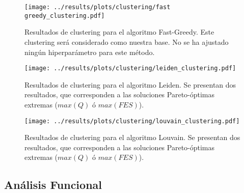 \begin{figure}[htbp]
	\centering
	\texttt{[image: ../results/plots/clustering/fast greedy\_clustering.pdf]}
	\caption{Resultados de clustering para el algoritmo Fast-Greedy. Este clustering será considerado como nuestra base. No se ha ajustado ningún hiperparámetro para este método.}
	\label{fig:fastgreedy_clustering}
\end{figure}

\begin{figure}[htbp]
	\centering
	\texttt{[image: ../results/plots/clustering/leiden\_clustering.pdf]}
	\caption{Resultados de clustering para el algoritmo Leiden. Se presentan dos resultados, que corresponden a las soluciones Pareto-óptimas extremas (\(max(Q)\) ó \(max(FES)\)).}
	\label{fig:leiden_clustering}
\end{figure}

\begin{figure}[htbp]
	\centering
	\texttt{[image: ../results/plots/clustering/louvain\_clustering.pdf]}
	\caption{Resultados de clustering para el algoritmo Louvain. Se presentan dos resultados, que corresponden a las soluciones Pareto-óptimas extremas (\(max(Q)\) ó \(max(FES)\)).}
	\label{fig:louvain_clustering}
\end{figure}

\subsection{Análisis Funcional}